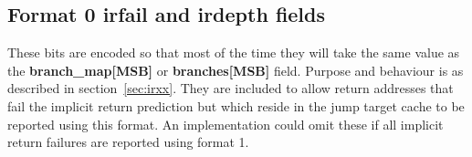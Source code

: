 \subsection{Format 0 \textbf{irfail} and \textbf{irdepth} fields}
These bits are encoded so that most of the time they will take the same value as the \textbf{branch\_map[MSB]} 
or \textbf{branches[MSB]} field.  Purpose and behaviour is as described in section~\ref{sec:irxx}.
They are included to allow return addresses that fail the implicit return prediction but 
which reside in the jump target cache to be reported using this format.  An implementation
could omit these if all implicit return failures are reported using format 1.


